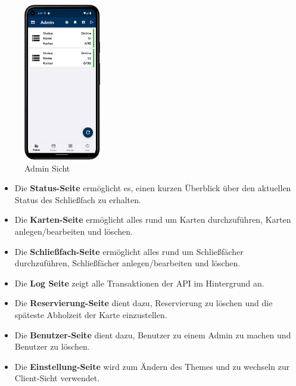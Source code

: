\newpage

\begin{figure}[h!]
\centering
\includegraphics[width=0.3\textwidth]{FLUTTER/images/ZB/status_page.png}
\caption{Admin Sicht}
\end{figure}

\begin{itemize}
    \item Die \textbf{Status-Seite} ermöglicht es, einen kurzen Überblick über den aktuellen Status des Schließfach zu erhalten.
    \item Die \textbf{Karten-Seite} ermöglicht alles rund um Karten durchzuführen, Karten anlegen/bearbeiten und löschen.
    \item Die \textbf{Schließfach-Seite} ermöglicht alles rund um Schließfächer durchzuführen, Schließfächer anlegen/bearbeiten und löschen.
    \item Die \textbf{Log Seite} zeigt alle Transaktionen der API im Hintergrund an.
    \item Die \textbf{Reservierung-Seite} dient dazu, Reservierung zu löschen und die späteste Abholzeit der Karte einzustellen.
    \item Die \textbf{Benutzer-Seite} dient dazu, Benutzer zu einem Admin zu machen und Benutzer zu löschen.
    \item Die \textbf{Einstellung-Seite} wird zum Ändern des Themes und zu wechseln zur Client-Sicht verwendet.
\end{itemize}

\newpage

